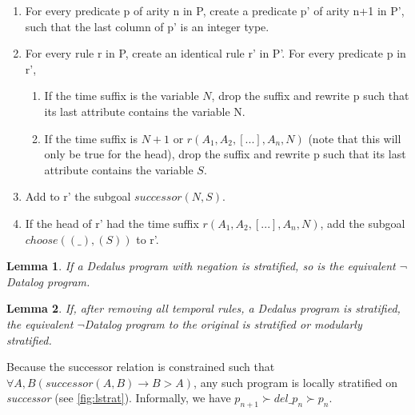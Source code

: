 \documentclass{acm_proc_article-sp-sigmod09}
\begin{document}
\begin{enumerate}
\item For every predicate p of arity n in P, create a predicate p' of arity n+1 in P', such that the last column of p' is an integer type.
\item For every rule r in P, create an identical rule r' in P'.  For every predicate p in r',  
\begin{enumerate}
	\item If the time suffix is the variable $N$, drop the suffix and rewrite p such that its last attribute contains the variable N.
	\item If the time suffix is $N+1$ or $r(A_{1}, A_{2},[...], A_{n},N)$ (note that this will only be true for the head), drop the suffix
	and rewrite p such that its last attribute contains the variable $S$.
\end{enumerate}
\item Add to r' the subgoal $successor(N, S)$.
\item If the head of r' had the time suffix  $r(A_{1}, A_{2},[...], A_{n},N)$, add the subgoal $choose((\_), (S))$ to r'.

\end{enumerate}

\newtheorem{lemma}{Lemma}
\begin{lemma}
If a Dedalus program with negation is stratified, so is the equivalent $\lnot$Datalog program.
\end{lemma}

\begin{lemma}
If, after removing all temporal rules, a Dedalus program is stratified, the equivalent $\lnot$Datalog program to the original
is stratified or modularly stratified.
\end{lemma}

 Because the successor relation is constrained
such that $\forall A,B (successor(A, B) \rightarrow B > A)$, any such program is locally stratified on \emph{successor} (see \ref{fig:lstrat}).  Informally,
we have $p_{n+1} \succ del\_p_{n} \succ p_{n}$.
\end{document}
